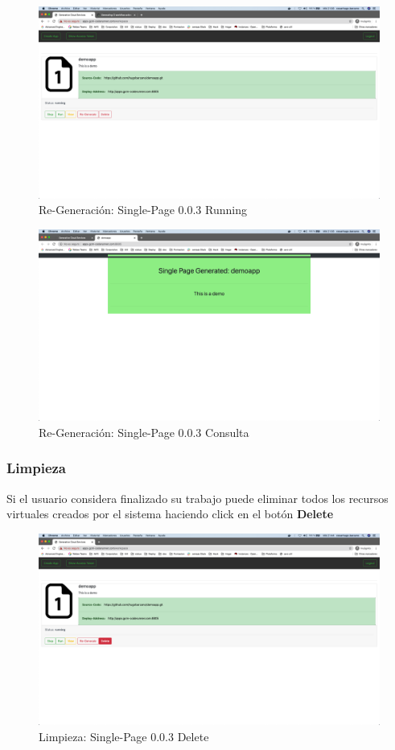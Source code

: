 \documentclass[a4paper,11pt]{book}
\begin{document}
   \begin{figure}[H]
\centering
\includegraphics[scale=0.2]{imagenes/casouso/4_8.png}
\caption{  Re-Generación: Single-Page 0.0.3 Running }
\end{figure}


   \begin{figure}[H]
\centering
\includegraphics[scale=0.2]{imagenes/casouso/4_9.png}
\caption{ Re-Generación: Single-Page 0.0.3 Consulta  }
\end{figure}

\subsubsection{Limpieza}

Si el usuario considera finalizado su trabajo puede eliminar todos los recursos virtuales creados por el sistema haciendo click en el botón \textbf{Delete}


   \begin{figure}[H]
\centering
\includegraphics[scale=0.2]{imagenes/casouso/5_1.png}
\caption{  Limpieza: Single-Page 0.0.3 Delete }
\end{figure}
\end{document}
